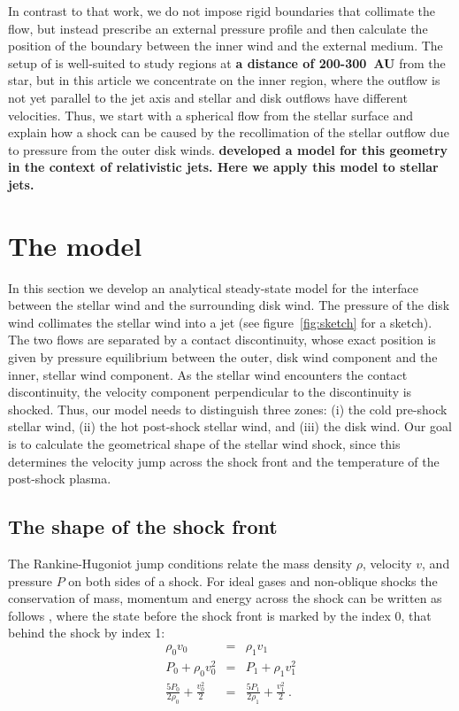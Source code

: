\documentclass[manuscript]{aastex}
\begin{document}
In contrast to that work, we do not impose rigid boundaries that collimate the flow, but instead prescribe an external pressure profile and then calculate the position of the boundary between the inner wind and the external medium. The setup of \citet{2011ApJ...737...54B} is well-suited to study regions at \textbf{a distance of 200-300~AU} from the star, but in this article we concentrate on the inner region, where the outflow is not yet parallel to the jet axis and stellar and disk outflows have different velocities. Thus, we start with a spherical flow from the stellar surface and explain how a shock can be caused by the recollimation of the stellar outflow due to pressure from the outer disk winds. 
\textbf{\citet{2012MNRAS.422.2282K} developed a model for this geometry in the context of relativistic jets. Here we apply this model to stellar jets.}

\section{The model}
\label{sect:model}
In this section we develop an analytical steady-state model for the interface between the stellar wind and the surrounding disk wind. The pressure of the disk wind collimates the stellar wind into a jet (see figure~\ref{fig:sketch} for a sketch). The two flows are separated by a contact discontinuity, whose exact position is given by pressure equilibrium between the outer, disk wind component and the inner, stellar wind component. As the stellar wind encounters the contact discontinuity, the velocity component perpendicular to the discontinuity is shocked. Thus, our model needs to distinguish three zones: (i) the cold pre-shock stellar wind, (ii) the hot post-shock stellar wind, and (iii) the disk wind. Our goal is to calculate the geometrical shape of the stellar wind shock, since this determines the velocity jump across the shock front and the temperature of the post-shock plasma. 

\subsection{The shape of the shock front}

The Rankine-Hugoniot jump conditions relate the mass density $\rho$, velocity $v$, and pressure $P$ on both sides of a shock. For ideal gases and non-oblique shocks the conservation of mass, momentum and energy across the shock can be written as follows \citep[][chap.~7]{1967pswh.book.....Z}, where the state before the shock front is marked by the index 0, that behind the shock by index 1:
\begin{eqnarray}
\rho_0 v_0 & = & \rho_1 v_1 \label{eqn:RH1}\\
\label{eqn:RH2}P_0+\rho_0 v_0^2 & = & P_1+\rho_1 v_1^2\\
\label{eqn:RH3}\frac{5 P_0}{2\rho_0}+\frac{v_0^2}{2}& = &\frac{5 P_1}{2\rho_1}+\frac{v_1^2}{2} \ .
\end{eqnarray}
\end{document}
